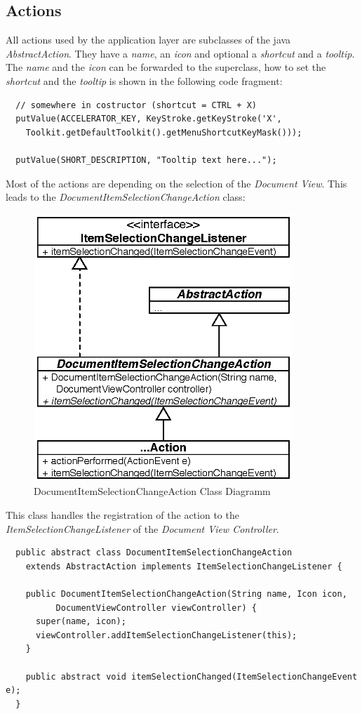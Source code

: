 \subsection{Actions}
All actions used by the application layer are subclasses of the java \textit{AbstractAction}. They have a \textit{name}, an \textit{icon} and optional a \textit{shortcut} and a \textit{tooltip}. The \textit{name} and the \textit{icon} can be forwarded to the superclass, how to set the \textit{shortcut} and the \textit{tooltip} is shown in the following code fragment:
\begin{verbatim}
  // somewhere in costructor (shortcut = CTRL + X)
  putValue(ACCELERATOR_KEY, KeyStroke.getKeyStroke('X',
    Toolkit.getDefaultToolkit().getMenuShortcutKeyMask()));

  putValue(SHORT_DESCRIPTION, "Tooltip text here...");
\end{verbatim}
Most of the actions are depending on the selection of the \textit{Document View}. This leads to the \textit{DocumentItemSelectionChangeAction} class:
\begin{figure}[H]
\begin{center}
  \includegraphics[height=3.97in, width=3.85in]{../images/finalreport/application_action.eps}
\caption{DocumentItemSelectionChangeAction Class Diagramm}
\label{application_ application_action}
\end{center}
\end{figure}
This class handles the registration of the action to the \textit{ItemSelectionChangeListener} of  the \textit{Document View Controller}.
\begin{verbatim}
  public abstract class DocumentItemSelectionChangeAction
    extends AbstractAction implements ItemSelectionChangeListener {
  
    public DocumentItemSelectionChangeAction(String name, Icon icon,
          DocumentViewController viewController) {
      super(name, icon);
      viewController.addItemSelectionChangeListener(this);
    }
    
    public abstract void itemSelectionChanged(ItemSelectionChangeEvent e);
  }
\end{verbatim}



